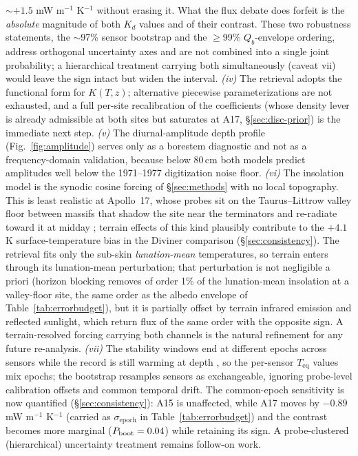 \documentclass[11pt]{article}
\newcommand{\zborestem}{80\,\si{\centi\meter}}
\begin{document}
$\sim$$+1.5$ mW m$^{-1}$ K$^{-1}$ without erasing it. What the flux
debate does forfeit is the \emph{absolute} magnitude of both $K_d$
values and of their contrast. These two robustness statements,
the $\sim$97\% sensor bootstrap and the $\ge$99\% $Q_b$-envelope
ordering, address orthogonal uncertainty axes and are not combined
into a single joint probability; a hierarchical treatment carrying
both simultaneously (caveat vii) would leave the sign intact but widen
the interval. \emph{(iv)} The
retrieval adopts the
\citet{hayne2017} functional form for $K(T,z)$; alternative piecewise
parameterizations are not exhausted, and a full per-site
recalibration of
the \citet{martinez2021} coefficients (whose density lever is already
admissible at both sites but saturates at A17,
\S\ref{sec:disc-prior}) is the immediate next step. \emph{(v)} The
diurnal-amplitude depth profile (Fig.~\ref{fig:amplitude}) serves only as a
borestem diagnostic and not as a frequency-domain validation, because below
$\zborestem$ both models predict amplitudes well below the 1971--1977
digitization noise floor. \emph{(vi)} The insolation model is the
synodic cosine forcing of \S\ref{sec:methods} with no local topography.
This is least realistic at Apollo~17, whose probes sit on the
Taurus--Littrow valley floor between massifs that shadow the site near
the terminators and re-radiate toward it at midday
\citep{langseth1976}; terrain effects of this kind plausibly contribute
to the $+4.1$ K surface-temperature bias in the Diviner comparison
(\S\ref{sec:consistency}). The retrieval fits only the
sub-skin \emph{lunation-mean} temperatures, so terrain enters through its
lunation-mean perturbation; that perturbation is not negligible a
priori (horizon blocking removes of order 1\% of the lunation-mean
insolation at a valley-floor site, the same order as the albedo
envelope of Table~\ref{tab:errorbudget}), but it is partially offset
by terrain infrared emission and reflected sunlight, which return flux
of the same order with the opposite sign. A terrain-resolved forcing
carrying both channels is the natural refinement for any future
re-analysis. \emph{(vii)} The stability windows end at different
epochs across sensors while the record is still warming at depth
\citep{nagihara2018}, so the per-sensor $T_\mathrm{eq}$ values mix
epochs; the bootstrap resamples sensors as exchangeable, ignoring
probe-level calibration offsets and common temporal drift. The
common-epoch sensitivity is now quantified
(\S\ref{sec:consistency}): A15 is unaffected, while A17 moves by
$-0.89$ mW m$^{-1}$ K$^{-1}$ (carried as $\sigma_\mathrm{epoch}$ in
Table~\ref{tab:errorbudget}) and the contrast becomes more marginal
($P_{\rm boot}=0.04$) while retaining its sign. A probe-clustered
(hierarchical) uncertainty treatment remains follow-on work.
\end{document}
